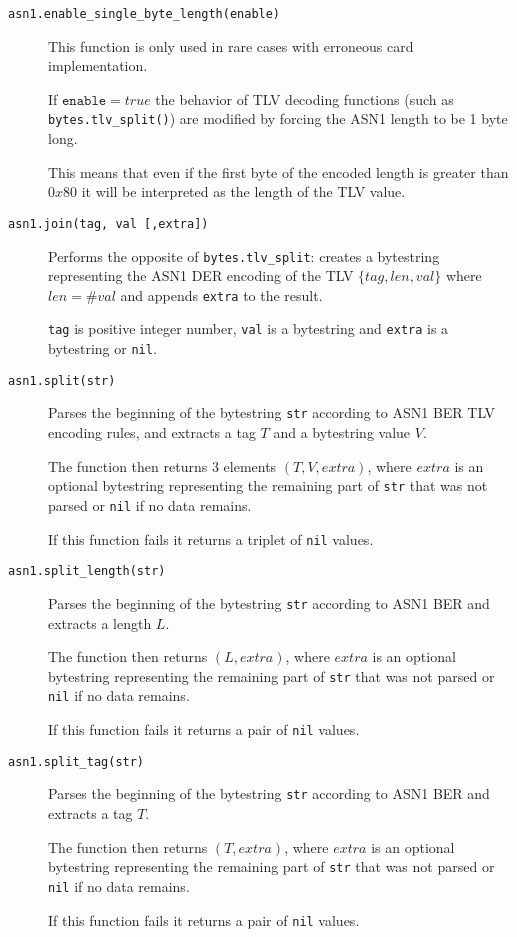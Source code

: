 \documentclass[11pt]{article}
\begin{document}
\begin{description}

\item[\texttt{asn1.enable\_single\_byte\_length(enable)}]
{
  This function is only used in rare cases with erroneous card implementation.
  
  If $\texttt{enable}=true$ the behavior of TLV decoding functions 
  (such as \texttt{bytes.tlv\_split()}) are modified by forcing the ASN1 
  length to be 1 byte long. 
  
  This means that even if the first byte of the encoded length is greater 
  than $0x80$ it will be interpreted as the length of the TLV value.
}

\item[\texttt{asn1.join(tag, val [,extra])}]
{
  Performs the opposite of \texttt{bytes.tlv\_split}: creates a bytestring 
  representing the ASN1 DER encoding of the TLV $\{tag,len,val\}$ where $len=\#val$ 
  and appends \texttt{extra} to the result.

  \texttt{tag} is positive integer number, \texttt{val} is a bytestring and 
  \texttt{extra} is a bytestring or \texttt{nil}.
}

\item[\texttt{asn1.split(str)}]
{
  Parses the beginning of the bytestring \texttt{str} according to ASN1 BER 
  TLV encoding rules, and extracts a tag $T$ and a bytestring value $V$.

  The function then returns 3 elements $(T, V, extra)$, 
  where $extra$ is an optional bytestring representing the remaining part of 
  \texttt{str} that was not parsed or \texttt{nil} if no data remains.

  If this function fails it returns a triplet of \texttt{nil} values.
}	

\item[\texttt{asn1.split\_length(str)}]
{
  Parses the beginning of the bytestring \texttt{str} according to ASN1 BER 
  and extracts a length $L$. 

  The function then returns $(L, extra)$, where $extra$ is an optional bytestring 
  representing the remaining part of \texttt{str} that was not parsed or \texttt{nil} 
  if no data remains.

  If this function fails it returns a pair of \texttt{nil} values.
}

\item[\texttt{asn1.split\_tag(str)}]
{
  Parses the beginning of the bytestring \texttt{str} according to ASN1 BER 
  and extracts a tag $T$. 

  The function then returns $(T, extra)$, where $extra$ is an optional bytestring 
  representing the remaining part of \texttt{str} that was not parsed or 
  \texttt{nil} if no data remains.

  If this function fails it returns a pair of \texttt{nil} values.
}

\end{description}
\end{document}
